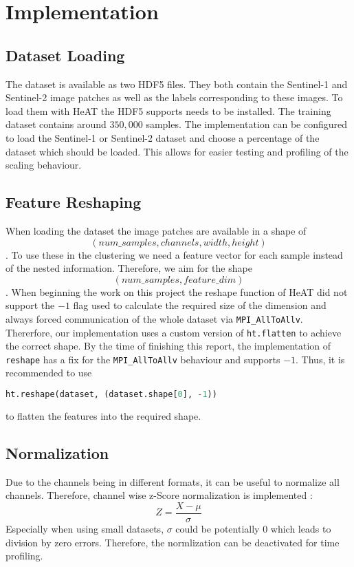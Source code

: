 \section{Implementation}
\label{sec:implementation}

\subsection{Dataset Loading}
\label{subsec:dataset_loading}
The dataset is available as two HDF5 files. They both contain the Sentinel-1 and Sentinel-2 image patches as well as the labels
corresponding to these images.
To load them with \gls{HeAT} the HDF5 supports needs to be installed.
The training dataset contains around \(350,000\) samples. The implementation can be configured to load
the Sentinel-1 or Sentinel-2 dataset and choose a percentage of the dataset which should be loaded.
This allows for easier testing and profiling of the scaling behaviour.


\subsection{Feature Reshaping}
\label{subsec:feature_reshaping}
When loading the dataset the image patches are available in a shape of \[(num\_samples, channels, width, height)\].
To use these in the clustering we need a feature vector for each sample instead of the nested information. Therefore,
we aim for the shape \[(num\_samples, feature\_dim)\].
When beginning the work on this project the reshape function of \gls{HeAT} did not support the \(-1\) flag used to
calculate the required size of the dimension and always forced communication of the whole dataset via \lstinline{MPI_AllToAllv}.
Thererfore, our implementation uses a custom version of \lstinline{ht.flatten} to achieve the correct shape.
By the time of finishing this report, the implementation of \lstinline{reshape} has a fix for the \lstinline{MPI_AllToAllv} behaviour and supports \(-1\).
Thus, it is recommended to use \begin{lstlisting}[language=Python]
    ht.reshape(dataset, (dataset.shape[0], -1))
\end{lstlisting}
to flatten the features into the required shape.

\subsection{Normalization}
\label{subsec:normalization}
Due to the channels being in different formats, it can be useful to normalize all channels.
Therefore, channel wise z-Score normalization is implemented \cite{wooldridge_introductory_2012}:
\[Z = \frac{X - \mu}{\sigma}\]
Especially when using small datasets, \(\sigma\) could be potentially \(0\) which leads to division by zero errors.
Therefore, the normlization can be deactivated for time profiling.

